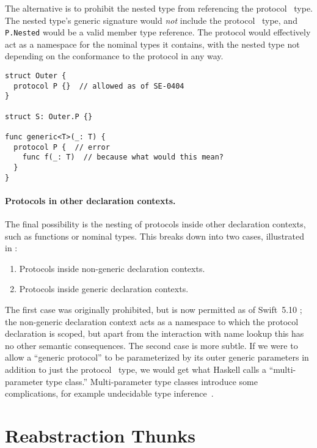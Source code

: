 \documentclass[../generics]{subfiles}
\begin{document}
The alternative is to prohibit the nested type from referencing the protocol \tSelf\ type. The nested type's generic signature would \emph{not} include the protocol \tSelf\ type, and \texttt{P.Nested} would be a valid member type reference. The protocol would effectively act as a namespace for the nominal types it contains, with the nested type not depending on the conformance to the protocol in any way.

\begin{listing}\label{protocol nested inside type}
\begin{Verbatim}
struct Outer {
  protocol P {}  // allowed as of SE-0404
}

struct S: Outer.P {}

func generic<T>(_: T) {
  protocol P {  // error
    func f(_: T)  // because what would this mean?
  }
}
\end{Verbatim}
\end{listing}

\paragraph{Protocols in other declaration contexts.} The final possibility is the nesting of protocols inside other declaration contexts, such as functions or nominal types. This breaks down into two cases, illustrated in :
\begin{enumerate}
\item Protocols inside non-generic declaration contexts.
\item Protocols inside generic declaration contexts.
\end{enumerate}
The first case was originally prohibited, but is now permitted as of Swift~5.10 \cite{se0404}; the non-generic declaration context acts as a namespace to which the protocol declaration is scoped, but apart from the interaction with name lookup this has no other semantic consequences. The second case is more subtle. If we were to allow a ``generic protocol'' to be parameterized by its outer generic parameters in addition to just the protocol \IndexSelf\tSelf\ type, we would get what Haskell calls a ``multi-parameter type class.'' Multi-parameter type classes introduce some complications, for example undecidable type inference~\cite{mptc}.

\section{Reabstraction Thunks}
\end{document}
